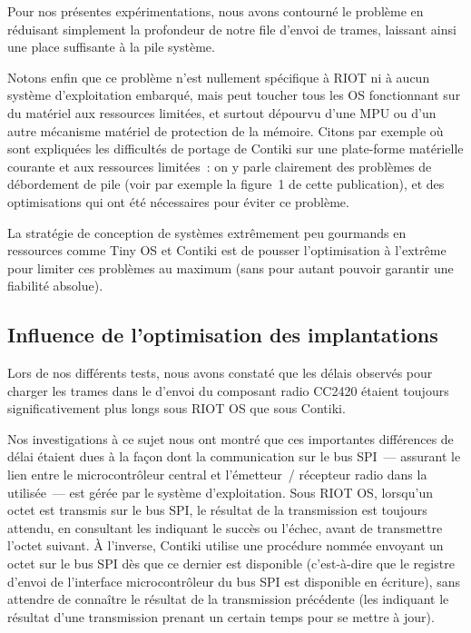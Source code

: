 Pour nos présentes expérimentations, nous avons contourné le problème
en réduisant simplement la profondeur de notre file d'envoi de trames,
laissant ainsi une place suffisante à la pile système.

\bigskip

Notons enfin que ce problème n'est nullement spécifique à RIOT ni à aucun
système d'exploitation embarqué, mais peut toucher tous les OS fonctionnant
sur du matériel aux ressources limitées, et surtout dépourvu d'une MPU ou
d'un autre mécanisme matériel de protection de la mémoire. Citons par
exemple \cite{ContikiPort8051} où sont expliquées les difficultés de portage
de Contiki sur une plate-forme matérielle courante et aux ressources
limitées~: on y parle clairement des problèmes de débordement de pile
(voir par exemple la figure~1 de cette publication), et des optimisations
qui ont été nécessaires pour éviter ce problème.

La stratégie de conception de systèmes extrêmement peu gourmands en
ressources comme Tiny OS et Contiki est de pousser l'optimisation à
l'extrême pour limiter ces problèmes au maximum (sans pour autant pouvoir
garantir une fiabilité absolue).


\subsection{Influence de l'optimisation des implantations}
\label{SubsecOptim}

Lors de nos différents tests, nous avons constaté que les délais
observés pour charger les trames dans le  d'envoi du
composant radio CC2420 étaient toujours significativement plus longs
sous RIOT OS que sous Contiki.

Nos investigations à ce sujet nous ont montré que ces importantes
différences de délai étaient dues à la façon dont la communication
sur le bus SPI~--- assurant le lien entre le microcontrôleur central
et l'émetteur~/ récepteur radio dans la  utilisée~--- est
gérée par le système d'exploitation. Sous RIOT OS, lorsqu'un octet est
transmis sur le bus SPI, le résultat de la transmission est toujours
attendu, en consultant les  indiquant le succès ou l'échec,
avant de transmettre l'octet suivant. À l'inverse, Contiki utilise une
procédure nommée  envoyant un octet sur le bus
SPI dès que ce dernier est disponible (c'est-à-dire que le registre
d'envoi de l'interface microcontrôleur du bus SPI est disponible en
écriture), sans attendre de connaître le résultat de la transmission
précédente (les  indiquant le résultat d'une transmission
prenant un certain temps pour se mettre à jour).

